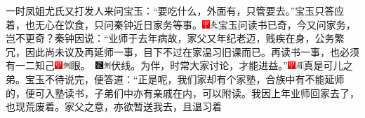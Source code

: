 一时凤姐尤氏又打发人来问宝玉：``要吃什么，外面有，只管要去。''宝玉只答应着，也无心在饮食，只问秦钟近日家务等事。{\includegraphics[width=3mm]{../Images/00002}\includegraphics[width=3mm]{../Images/00012}\footnotesize \kaishu 宝玉问读书已奇，今又问家务，岂不更奇？}秦钟因说：``业师于去年病故，家父又年纪老迈，贱疾在身，公务繁冗，因此尚未议及再延师一事，目下不过在家温习旧课而已。再读书一事，也必须有一二知己{{\includegraphics[width=3mm]{../Images/00002}\includegraphics[width=3mm]{../Images/00011}\footnotesize \kaishu 眼。　}\includegraphics[width=3mm]{../Images/00006}\includegraphics[width=3mm]{../Images/00011}\footnotesize \kaishu 伏线。}为伴，时常大家讨论，才能进益。''{\includegraphics[width=3mm]{../Images/00002}\includegraphics[width=3mm]{../Images/00010}\footnotesize \kaishu 真是可儿之弟。}宝玉不待说完，便答道：``正是呢，我们家却有个家塾，合族中有不能延师的，便可入塾读书，子弟们中亦有亲戚在内，可以附读。我因上年业师回家去了，也现荒废着。家父之意，亦欲暂送我去，且温习着
